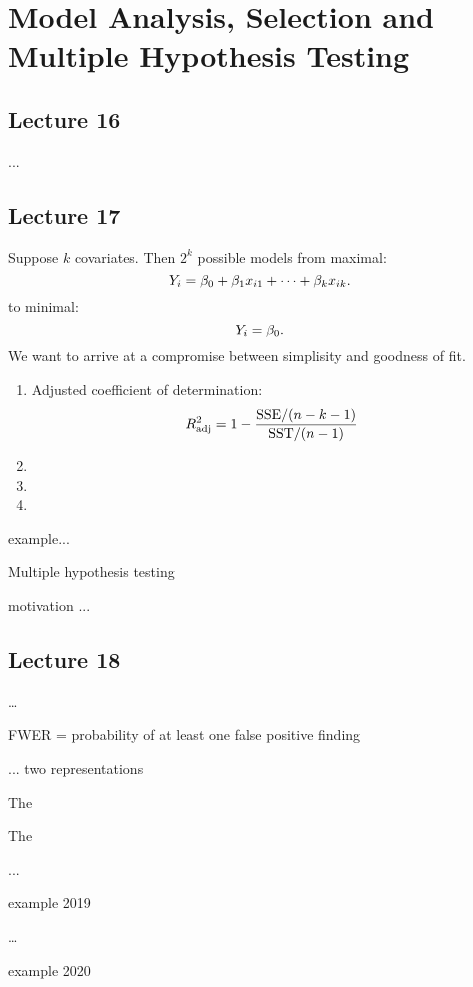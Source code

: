 \section{Model Analysis, Selection and Multiple Hypothesis Testing}





 

\subsection*{Lecture 16}

...






\subsection*{Lecture 17}
Suppose $k$ covariates. Then $2^k$ possible models from maximal:
$$
    Y_i = \beta_0+\beta_1x_{i1} + \dots + \beta_kx_{ik}.
$$
to minimal:
$$
    Y_i = \beta_0.
$$
We want to arrive at a compromise between simplisity and goodness of fit. 

\begin{enumerate}
    \item Adjusted coefficient of determination:
    $$
        R^2_{\mathrm{adj}} = 1 - \frac{\mathrm{SSE} / (n-k-1)}{\mathrm{SST} / (n-1)}
    $$
    \item 
    \item 
    \item 
\end{enumerate}
  

example...

\newpage

{Multiple hypothesis testing}


motivation ...

\subsection*{Lecture 18}

\dots


FWER = probability of at least one false positive finding


... two representations 


The 

  

The 


...

example 2019 



\dots

example 2020
